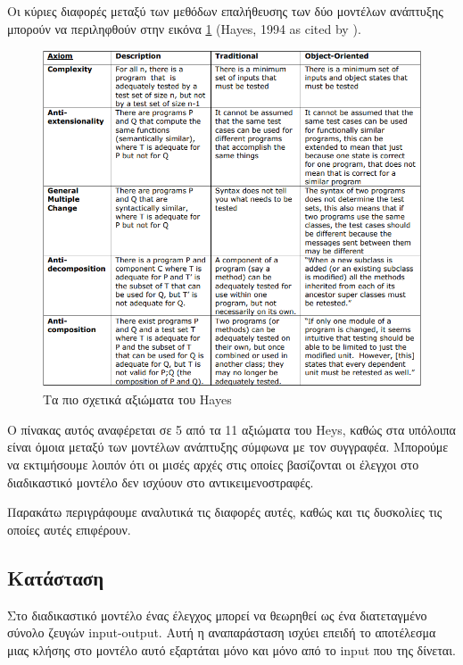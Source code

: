 \documentclass[12pt]{article}
\begin{document}
Οι κύριες διαφορές μεταξύ των μεθόδων επαλήθευσης των δύο μοντέλων ανάπτυξης μπορούν να περιληφθούν στην εικόνα \ref{fig:hayes_table} (Hayes, 1994 as cited by \textcite{gordon}).

\begin{figure}
\label{fig:hayes_table}
\caption{Τα πιο σχετικά αξιώματα του Hayes}
\includegraphics[width=\textwidth,height=\textheight,keepaspectratio]{hayes_table.PNG}
\end{figure}

\par Ο πίνακας αυτός αναφέρεται σε 5 από τα 11 αξιώματα του Heys, καθώς στα υπόλοιπα είναι όμοια μεταξύ των μοντέλων ανάπτυξης σύμφωνα με τον συγγραφέα. Μπορούμε να εκτιμήσουμε λοιπόν ότι οι μισές αρχές στις οποίες βασίζονται οι έλεγχοι στο διαδικαστικό μοντέλο δεν ισχύουν στο αντικειμενοστραφές.

\par Παρακάτω περιγράφουμε αναλυτικά τις διαφορές αυτές, καθώς και τις δυσκολίες τις οποίες αυτές επιφέρουν.

\subsection{Κατάσταση}

Στο διαδικαστικό μοντέλο ένας έλεγχος μπορεί να θεωρηθεί ως ένα διατεταγμένο σύνολο ζευγών input-output. Αυτή η αναπαράσταση ισχύει επειδή το αποτέλεσμα μιας κλήσης στο μοντέλο αυτό εξαρτάται μόνο και μόνο από το input που της δίνεται.
\end{document}
